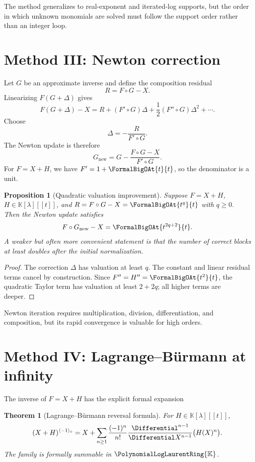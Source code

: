 \documentclass[11pt,openany]{book}
\theoremstyle{definition}
\theoremstyle{plain}
\newtheorem{theorem}{Theorem}[chapter]
\newtheorem{proposition}{Proposition}[chapter]
\theoremstyle{remark}
\newcommand{\K}{\mathbb{K}}
\newcommand{\Plog}{\PolynomialLogLaurentRing{\K}}
\newcommand{\invcomp}{^{\langle -1\rangle_{\circ}}}
\begin{document}
The method generalizes to real-exponent and iterated-log supports, but the order in which unknown monomials are solved must follow the support order rather than an integer loop.

\section{Method III: Newton correction}
Let \(G\) be an approximate inverse and define the composition residual
\begin{equation}\label{eq:inverse-residual}
 R=F\circ G-X.
\end{equation}
Linearizing \(F(G+\Delta)\) gives
\[
 F(G+\Delta)-X
 =R+(F'\circ G)\Delta+\frac12(F''\circ G)\Delta^2+\cdots.
\]
Choose
\begin{equation}\label{eq:newton-composition}
 \Delta=-\frac{R}{F'\circ G}.
\end{equation}
The Newton update is therefore
\begin{equation}\label{eq:newton-reversion}
 G_{\mathrm{new}}
 =G-\frac{F\circ G-X}{F'\circ G}.
\end{equation}
For \(F=X+H\), we have \(F'=1+\FormalBigOAt{t}{t}\), so the denominator is a unit.

\begin{proposition}[Quadratic valuation improvement]\label{prop:newton-improvement}
Suppose \(F=X+H\), \(H\in\K[\lambda][[t]]\), and \(R=F\circ G-X=\FormalBigOAt{t^q}{t}\) with \(q\ge0\). Then the Newton update satisfies
\begin{equation}\label{eq:newton-improvement}
 F\circ G_{\mathrm{new}}-X=\FormalBigOAt{t^{2q+2}}{t}.
\end{equation}
A weaker but often more convenient statement is that the number of correct blocks at least doubles after the initial normalization.
\end{proposition}

\begin{proof}
The correction \(\Delta\) has valuation at least \(q\). The constant and linear residual terms cancel by construction. Since \(F''=H''=\FormalBigOAt{t^2}{t}\), the quadratic Taylor term has valuation at least \(2+2q\); all higher terms are deeper.
\end{proof}

Newton iteration requires multiplication, division, differentiation, and composition, but its rapid convergence is valuable for high orders.

\section{Method IV: Lagrange--B\"urmann at infinity}
The inverse of \(F=X+H\) has the explicit formal expansion
\begin{theorem}[Lagrange--B\"urmann reversal formula]\label{thm:lagrange-infinity}
For \(H\in\K[\lambda][[t]]\),
\begin{equation}\label{eq:lagrange-infinity}
 (X+H)\invcomp
 =X+\sum_{n\ge1}\frac{(-1)^n}{n!}
 \frac{\Differential^{n-1}}{\Differential X^{n-1}}\bigl(H(X)^n\bigr).
\end{equation}
The family is formally summable in \(\Plog\).
\end{theorem}
\end{document}
